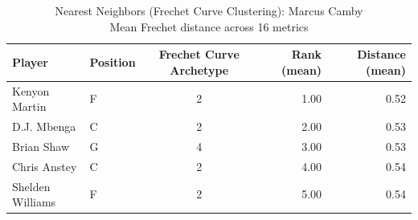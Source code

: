 \begin{table}[t]
\caption*{
{\fontsize{20}{25} Nearest Neighbors (Frechet Curve Clustering): Marcus Camby\fontsize{12}{15}\selectfont } \\ 
{\fontsize{14}{17}\selectfont  Mean Frechet distance across 16 metrics\fontsize{12}{15}\selectfont }
} 
\fontsize{12.0pt}{14.0pt}\selectfont
\begin{tabular*}{\linewidth}{@{\extracolsep{\fill}}llcrr}
\toprule
Player & Position & Frechet Curve Archetype & Rank (mean) & Distance (mean) \\ 
\midrule\addlinespace[2.5pt]
Kenyon Martin & F & 2 & 1.00 & 0.52 \\ 
D.J. Mbenga & C & 2 & 2.00 & 0.53 \\ 
Brian Shaw & G & 4 & 3.00 & 0.53 \\ 
Chris Anstey & C & 2 & 4.00 & 0.54 \\ 
Shelden Williams & F & 2 & 5.00 & 0.54 \\ 
\bottomrule
\end{tabular*}
\end{table}

